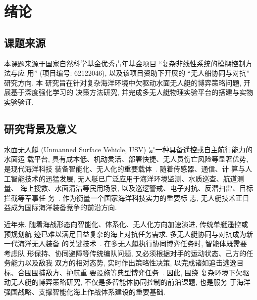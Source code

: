 \chapter{绪论}
\label{cha:intro}

\section{课题来源}
\label{sec:source}
本课题来源于国家自然科学基金优秀青年基金项目 ``复杂非线性系统的模糊控制方法与应
用'' (项目编号: 62122046), 以及该项目资助下开展的 ``无人船协同与对抗'' 研究方向. 本
研究旨在针对复杂海洋环境中欠驱动水面无人艇的博弈策略问题, 开展基于深度强化学习的
决策方法研究, 并完成多无人艇物理实验平台的搭建与实物实验验证.

\section{研究背景及意义}
\label{sec:background}
水面无人艇 (Unmanned Surface Vehicle, USV) 是一种具备遥控或自主航行能力的水面运
载平台, 具有成本低、机动灵活、部署快捷、无人员伤亡风险等显著优势, 是现代海洋科技
装备智能化、无人化的重要载体~\cite{peng2021usv,liao2014usv}. 随着传感器、通信、计
算与人工智能技术的迅猛发展, 无人艇已广泛应用于海洋环境监测、水质巡查、航道测量、
海上搜救、水面清洁等民用场景, 以及巡逻警戒、电子对抗、反潜扫雷、目标拦截等军事任
务~\cite{jin2018marine,roberts2008marine}. 作为衡量一个国家海洋科技实力的重要标
志, 无人艇技术正日益成为国际海洋装备竞争的前沿方向.

近年来, 随着海战形态向智能化、体系化、无人化方向加速演进, 传统单艇遥控或预规划航
迹已难以满足日益复杂的海上对抗任务需求. 多无人艇协同与对抗成为新一代海洋无人装备
的关键技术~\cite{peng2021usv}. 在多无人艇执行协同博弈任务时, 智能体既需要考虑队
形保持、协同避障等传统编队问题, 又必须根据对手的运动状态、己方的任务能力以及敌我
双方的相对态势, 实时作出策略性决策, 以完成诸如追击逃逸目标、合围围捕敌方、护航重
要设施等典型博弈任务~\cite{su2022confrontation,xia2023cooperativeusv}. 因此, 围绕
复杂环境下欠驱动无人艇的博弈策略研究, 不仅是多智能体协同控制的前沿课题, 也是服务
于海洋强国战略、支撑智能化海上作战体系建设的重要基础.

\begin{figure}[!htbp]
  \centering
  \vspace{2.5cm}
  \label{fig:usv_overview}
\end{figure}

